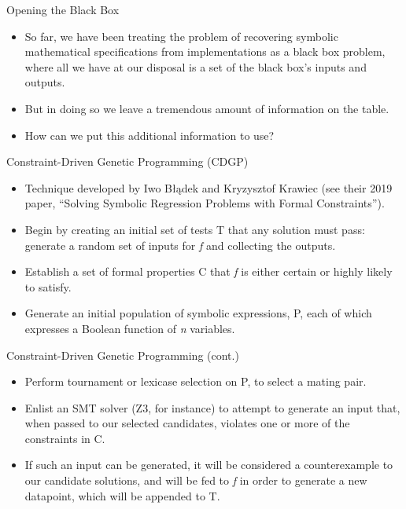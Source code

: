 \documentclass[presentation]{beamer}
\begin{document}
\begin{frame}[label={sec:orga905f54}]{Opening the Black Box}
\begin{itemize}
\item So far, we have been treating the problem of recovering symbolic mathematical specifications from implementations as a \alert{black box} problem, where all we have at our disposal is a set of the black box's inputs and outputs.
\item But in doing so we leave a tremendous amount of information on the table.
\item How can we put this additional information to use?
\end{itemize}
\end{frame}


\begin{frame}[label={sec:orgd93e005}]{Constraint-Driven Genetic Programming (CDGP)}
\begin{itemize}
\item Technique developed by Iwo Błądek and Kryzysztof Krawiec (see their 2019 paper, ``Solving Symbolic Regression Problems with Formal Constraints'').
\item Begin by creating an initial set of tests \alert{T} that any solution must pass: generate a random set of inputs for \emph{f} and collecting the outputs.
\item Establish a set of formal properties \alert{C} that \emph{f} is either certain or highly likely to satisfy.
\item Generate an initial population of symbolic expressions, \alert{P}, each of which expresses a Boolean function of \emph{n} variables.
\end{itemize}
\end{frame}

\begin{frame}[label={sec:org0c2f115}]{Constraint-Driven Genetic Programming (cont.)}
\begin{itemize}
\item Perform tournament or lexicase selection on \alert{P}, to select a mating pair.
\item Enlist an SMT solver (Z3, for instance) to attempt to generate an input that, when passed to our selected candidates, violates one or more of the constraints in \alert{C}.
\item If such an input can be generated, it will be considered a counterexample to our candidate solutions, and will be fed to \emph{f} in order to generate a new datapoint, which will be appended to \alert{T}.
\end{itemize}
\end{frame}
\end{document}
